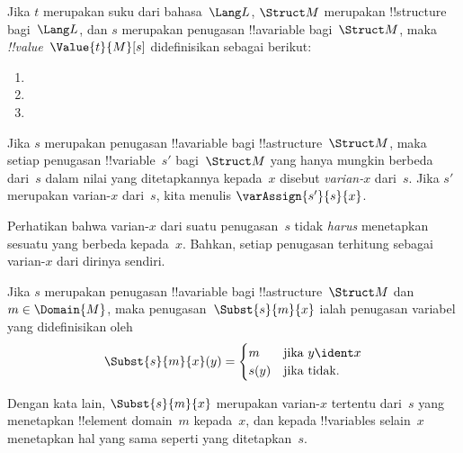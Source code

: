 \documentclass[../../../include/open-logic-section]{subfiles}
\begin{document}
\begin{defn}
Jika $t$ merupakan suku dari bahasa~$\Lang L$, $\Struct M$ merupakan
!!{structure} bagi~$\Lang L$, dan $s$ merupakan penugasan
!!a{variable} bagi~$\Struct M$, maka \emph{!!{value}}~$\Value{t}{M}[s]$
didefinisikan sebagai berikut:
\begin{enumerate}
\item {}
\item {}
\item {}
\end{enumerate}
\end{defn}

\begin{defn}[Varian-$x$]
Jika $s$ merupakan penugasan !!a{variable} bagi !!a{structure}~$\Struct M$,
maka setiap penugasan !!{variable}~$s'$ bagi~$\Struct M$ yang hanya mungkin
berbeda dari~$s$ dalam nilai yang ditetapkannya kepada~$x$ disebut
\emph{varian-$x$} dari~$s$. Jika $s'$ merupakan varian-$x$ dari~$s$, kita
menulis $\varAssign{s'}{s}{x}$.
\end{defn}

\begin{explain}
Perhatikan bahwa varian-$x$ dari suatu penugasan~$s$ tidak
\emph{harus} menetapkan sesuatu yang berbeda kepada~$x$. Bahkan, setiap
penugasan terhitung sebagai varian-$x$ dari dirinya sendiri.
\end{explain}

\begin{defn}
  Jika $s$ merupakan penugasan !!a{variable} bagi !!a{structure}~$\Struct M$
  dan $m \in \Domain{M}$, maka penugasan~$\Subst{s}{m}{x}$ ialah penugasan
  variabel yang didefinisikan oleh
  \[\Subst{s}{m}{x}(y) = \begin{cases}
    m & \text{jika } y \ident x\\
    s(y) & \text{jika tidak}.
  \end{cases}\]
\end{defn}

Dengan kata lain, $\Subst{s}{m}{x}$ merupakan varian-$x$ tertentu dari~$s$
yang menetapkan !!{element} domain~$m$ kepada~$x$, dan kepada
!!{variable}s selain~$x$ menetapkan hal yang sama seperti yang
ditetapkan~$s$.
\end{document}
